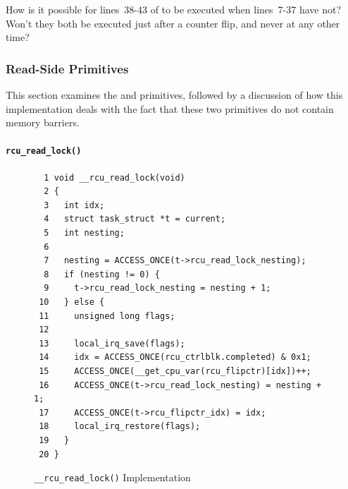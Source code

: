 \QuickQuiz{}
	How is it possible for lines~38-43 of
	 to be executed when
	lines~7-37 have not?
	Won't they both be executed just after a counter flip, and
	never at any other time?
 \QuickQuizEnd


\subsubsection{Read-Side Primitives}
\label{app:rcuimpl:Read-Side Primitives}

This section examines the  and
 primitives, followed by a
discussion of how this implementation deals with the fact
that these two primitives do not contain memory barriers.

\paragraph{{\tt rcu\_read\_lock()}}
\label{app:rcuimpl:rcu_read_lock()}

\begin{figure}[tbp]
{ \scriptsize
\begin{verbatim}
  1 void __rcu_read_lock(void)
  2 {
  3   int idx;
  4   struct task_struct *t = current;
  5   int nesting;
  6
  7   nesting = ACCESS_ONCE(t->rcu_read_lock_nesting);
  8   if (nesting != 0) {
  9     t->rcu_read_lock_nesting = nesting + 1;
 10   } else {
 11     unsigned long flags;
 12
 13     local_irq_save(flags);
 14     idx = ACCESS_ONCE(rcu_ctrlblk.completed) & 0x1;
 15     ACCESS_ONCE(__get_cpu_var(rcu_flipctr)[idx])++;
 16     ACCESS_ONCE(t->rcu_read_lock_nesting) = nesting + 1;
 17     ACCESS_ONCE(t->rcu_flipctr_idx) = idx;
 18     local_irq_restore(flags);
 19   }
 20 }
\end{verbatim}
}
\caption{{\tt \_\_rcu\_read\_lock()} Implementation}
\label{fig:app:rcuimpl:__rcu_read_lock() Implementation}
\end{figure}

